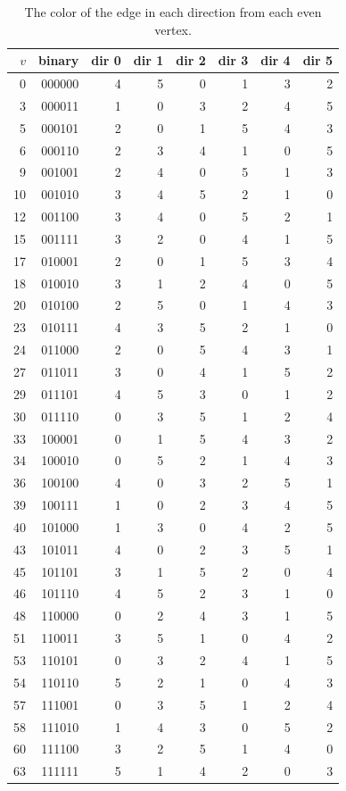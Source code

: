 \documentclass[11pt]{article}
\begin{document}
\begin{table}[htbp]
\centering
\caption{The color of the edge in each direction from each even vertex.}
\label{tab:coloring}
\small
\begin{tabular}{rrrrrrrr}
\toprule
\(v\) & binary & dir 0 & dir 1 & dir 2 & dir 3 & dir 4 & dir 5 \\
\midrule
0  & 000000 & 4 & 5 & 0 & 1 & 3 & 2 \\
3  & 000011 & 1 & 0 & 3 & 2 & 4 & 5 \\
5  & 000101 & 2 & 0 & 1 & 5 & 4 & 3 \\
6  & 000110 & 2 & 3 & 4 & 1 & 0 & 5 \\
9  & 001001 & 2 & 4 & 0 & 5 & 1 & 3 \\
10 & 001010 & 3 & 4 & 5 & 2 & 1 & 0 \\
12 & 001100 & 3 & 4 & 0 & 5 & 2 & 1 \\
15 & 001111 & 3 & 2 & 0 & 4 & 1 & 5 \\
17 & 010001 & 2 & 0 & 1 & 5 & 3 & 4 \\
18 & 010010 & 3 & 1 & 2 & 4 & 0 & 5 \\
20 & 010100 & 2 & 5 & 0 & 1 & 4 & 3 \\
23 & 010111 & 4 & 3 & 5 & 2 & 1 & 0 \\
24 & 011000 & 2 & 0 & 5 & 4 & 3 & 1 \\
27 & 011011 & 3 & 0 & 4 & 1 & 5 & 2 \\
29 & 011101 & 4 & 5 & 3 & 0 & 1 & 2 \\
30 & 011110 & 0 & 3 & 5 & 1 & 2 & 4 \\
33 & 100001 & 0 & 1 & 5 & 4 & 3 & 2 \\
34 & 100010 & 0 & 5 & 2 & 1 & 4 & 3 \\
36 & 100100 & 4 & 0 & 3 & 2 & 5 & 1 \\
39 & 100111 & 1 & 0 & 2 & 3 & 4 & 5 \\
40 & 101000 & 1 & 3 & 0 & 4 & 2 & 5 \\
43 & 101011 & 4 & 0 & 2 & 3 & 5 & 1 \\
45 & 101101 & 3 & 1 & 5 & 2 & 0 & 4 \\
46 & 101110 & 4 & 5 & 2 & 3 & 1 & 0 \\
48 & 110000 & 0 & 2 & 4 & 3 & 1 & 5 \\
51 & 110011 & 3 & 5 & 1 & 0 & 4 & 2 \\
53 & 110101 & 0 & 3 & 2 & 4 & 1 & 5 \\
54 & 110110 & 5 & 2 & 1 & 0 & 4 & 3 \\
57 & 111001 & 0 & 3 & 5 & 1 & 2 & 4 \\
58 & 111010 & 1 & 4 & 3 & 0 & 5 & 2 \\
60 & 111100 & 3 & 2 & 5 & 1 & 4 & 0 \\
63 & 111111 & 5 & 1 & 4 & 2 & 0 & 3 \\
\bottomrule
\end{tabular}
\end{table}
\end{document}
